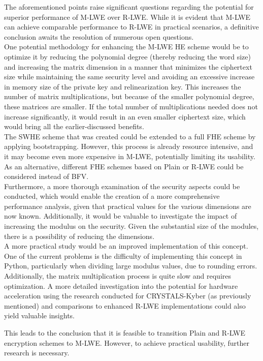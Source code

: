 The aforementioned points raise significant questions regarding the potential for superior performance of M-LWE over R-LWE. While it is evident that M-LWE can achieve comparable performance to R-LWE in practical scenarios, a definitive conclusion awaits the resolution of numerous open questions.\\
One potential methodology for enhancing the M-LWE HE scheme would be to optimize it by reducing the polynomial degree (thereby reducing the word size) and increasing the matrix dimension in a manner that minimizes the ciphertext size while maintaining the same security level and avoiding an excessive increase in memory size of the private key and relinearization key. This increases the number of matrix multiplications, but because of the smaller polynomial degree, these matrices are smaller. If the total number of multiplications needed does not increase significantly, it would result in an even smaller ciphertext size, which would bring all the earlier-discussed benefits.\\
The SWHE scheme that was created could be extended to a full FHE scheme by applying bootstrapping. However, this process is already resource intensive, and it may become even more expensive in M-LWE, potentially limiting its usability. As an alternative, different FHE schemes based on Plain or R-LWE could be considered instead of BFV. \\
Furthermore, a more thorough examination of the security aspects could be conducted, which would enable the creation of a more comprehensive performance analysis, given that practical values for the various dimensions are now known. Additionally, it would be valuable to investigate the impact of increasing the modulus on the security. Given the substantial size of the modules, there is a possibility of reducing the dimensions.\\
A more practical study would be an improved implementation of this concept. One of the current problems is the difficulty of implementing this concept in Python, particularly when dividing large modulus values, due to rounding errors. Additionally, the matrix multiplication process is quite slow and requires optimization. A more detailed investigation into the potential for hardware acceleration using the research conducted for CRYSTALS-Kyber (as previously mentioned) and comparisons to enhanced R-LWE implementations could also yield valuable insights.

This leads to the conclusion that it is feasible to transition Plain and R-LWE encryption schemes to M-LWE. However, to achieve practical usability, further research is necessary.
